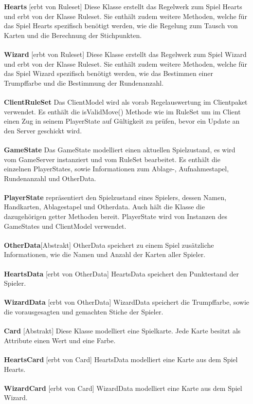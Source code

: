 \documentclass{article}
\begin{document}
		\textbf{Hearts} [erbt von Ruleset]  Diese Klasse erstellt das Regelwerk zum Spiel Hearts und erbt von der Klasse Ruleset. Sie enthält zudem weitere Methoden, welche für das Spiel Hearts spezifisch benötigt werden, wie die Regelung zum Tausch von Karten und die Berechnung der Stichpunkten. \\ \\
		
		\textbf{Wizard} [erbt von Ruleset] Diese Klasse erstellt das Regelwerk zum Spiel Wizard und erbt von der Klasse Ruleset. Sie enthält zudem weitere Methoden, welche für das Spiel Wizard spezifisch benötigt werden, wie das Bestimmen einer Trumpffarbe und die Bestimmung der Rundenanzahl. \\ \\
		
		\textbf{ClientRuleSet}  Das ClientModel wird als vorab Regelauswertung im Clientpaket verwendet. Es enthält die isValidMove() Methode wie im RuleSet um im Client einen Zug in seinem PlayerState auf Gültigkeit zu prüfen, bevor ein Update an den Server geschickt wird. \\ \\
		
		\textbf{GameState} Das GameState modelliert einen aktuellen Spielzustand, es wird vom GameServer instanziert und vom RuleSet bearbeitet. Es enthält die einzelnen PlayerStates, sowie Informationen zum Ablage-, Aufnahmestapel, Rundenanzahl und OtherData. \\ \\
		
		\textbf{PlayerState} repräsentiert den Spielzustand eines Spielers, dessen Namen, Handkarten, Ablagestapel und Otherdata. Auch hält die Klasse die dazugehörigen getter Methoden bereit. PlayerState wird von Instanzen des GameStates und ClientModel verwendet. \\ \\
		
		\textbf{OtherData}[Abstrakt] OtherData speichert zu einem Spiel zusätzliche Informationen, wie die Namen und Anzahl der Karten aller Spieler. \\ \\
		\textbf{HeartsData} [erbt von OtherData] HeartsData speichert den Punktestand der Spieler. \\ \\
		
		\textbf{WizardData} [erbt von OtherData] WizardData speichert die Trumpffarbe, sowie die vorausgesagten und gemachten Stiche der Spieler. \\ \\
		\textbf{Card} [Abstrakt] Diese Klasse modelliert eine Spielkarte. Jede Karte besitzt als Attribute einen Wert und eine Farbe. \\ \\
		\textbf{HeartsCard} [erbt von Card]  HeartsData modelliert eine Karte aus dem Spiel Hearts. \\ \\
		\textbf{WizardCard} [erbt von Card] WizardData modelliert eine Karte aus dem Spiel Wizard. \\ \\
\end{document}
